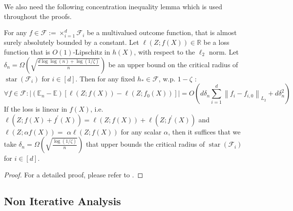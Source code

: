 \documentclass[14pt]{extarticle} %
\begin{document}

We also need the following concentration inequality lemma which is used throughout the proofs. 
\begin{lemma}\label{lem:local-concen}
For any $f \in \mathcal{F}:=\times_{i=1}^d \mathcal{F}_i$ be a multivalued outcome function, that is almost surely absolutely bounded by a constant. Let $\ell(Z ; f(X)) \in \mathbb{R}$ be a loss function that is $O(1)$-Lipschitz in $h(X)$, with respect to the $\ell_2$ norm. Let $\delta_n=\Omega\left(\sqrt{\frac{d \log \log (n)+\log (1 / \zeta)}{n}}\right)$ be an upper bound on the critical radius of $\operatorname{star}\left(\mathcal{F}_i\right)$ for $i \in[d]$. Then for any fixed $h_* \in \mathcal{F}$, w.p. $1-\zeta$ :
$$
\forall f \in \mathcal{F}:\left|\left(\mathbb{E}_n-\mathbb{E}\right)\left[\ell(Z ; f(X))-\ell\left(Z ; f_0(X)\right)\right]\right|=O\left(d \delta_n \sum_{i=1}^d\left\|f_i-f_{i, 0}\right\|_{L_2}+d \delta_n^2\right)
$$
If the loss is linear in $f(X)$, i.e. $\ell\left(Z ; f(X)+f^{\prime}(X)\right)=\ell(Z ; f(X))+\ell\left(Z ; f^{\prime}(X)\right)$ and $\ell(Z ; \alpha f(X))=$ $\alpha \ell(Z ; f(X))$ for any scalar $\alpha$, then it suffices that we take $\delta_n=\Omega\left(\sqrt{\frac{\log (1 / \zeta)}{n}}\right)$ that upper bounds the critical radius of $\operatorname{star}\left(\mathcal{F}_i\right)$ for $i \in[d]$.
\end{lemma}
\begin{proof}
    For a detailed proof, please refer to \cite{foster2019orthogonal}.
\end{proof}
\subsection{Non Iterative Analysis}
\end{document}
